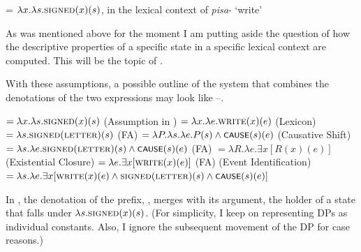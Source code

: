 \documentclass[output=paper,colorlinks,citecolor=brown]{langscibook}
\begin{document}
\ea   {} = $\lambda x.\lambda s. \textsc{signed}(x)(s)$, in the lexical context of \textit{pisa}- ‘write’\label{ex:tatevosov:86}
\z

\noindent As was mentioned above for the moment I am putting aside the question of how the descriptive properties of a specific state in a specific lexical context are computed. This will be  the topic of .

With these assumptions, a possible outline of the system that combines the denotations of the two expressions may look like --.

\ea\label{ex:tatevosov:87}
\ea    {} $= \lambda x.\lambda s. \textsc{signed}(x)(s)$        \hfill (Assumption in )\label{ex:tatevosov:87a}
\ex    {} $= \lambda x.\lambda e. \textsc{write}(x)(e)$         \hfill (Lexicon)\label{ex:tatevosov:87b}
\ex    {} $= \lambda s. \textsc{signed}(\textsc{letter})(s)$      \hfill (FA)\label{ex:tatevosov:87c}
\ex  {} $= \lambda P.\lambda s.\lambda e. P(s) \wedge \cnst{cause}(s)(e)$      \hfill (Causative Shift)\label{ex:tatevosov:87d}
\ex    {} $= \lambda s.\lambda e. \textsc{signed}(\textsc{letter})(s) \wedge \cnst{cause}(s)(e)$   \hfill (FA)\label{ex:tatevosov:87e}
\ex    {} $= \lambda R. \lambda e. \exists x [R(x)(e)]$         \hfill (Existential Closure)\label{ex:tatevosov:87f}
\ex    {} $= \lambda e.\exists x [\textsc{write}(x)(e)]$ \hfill (FA)\label{ex:tatevosov:87g}
\ex {} \hfill (Event Identification)\\$= \lambda s.\lambda e.\exists x [\textsc{write}(x)(e) \wedge \textsc{signed}(\textsc{letter})(s) \wedge \cnst{cause}(s)(e)]$\label{ex:tatevosov:87h}
\z
\z

\noindent In , the denotation of the prefix, , merges with its argument, the holder of a state that falls under $\lambda s.\textsc{signed}(x)(s)$. (For simplicity, I keep on representing DPs as individual constants. Also, I ignore the subsequent movement of the DP for case reasons.)
\end{document}
